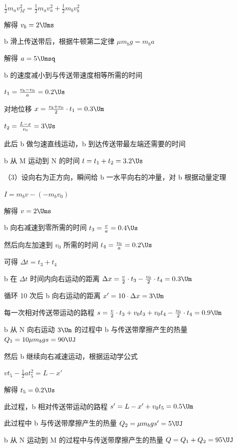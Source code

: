 \documentclass[\gkver]{gaokaozhenti}
\begin{document}
\begin{enumerate}
{$\frac{1}{2}m_{a}v_{M}^{2} = \frac{1}{2}m_{a}v_{a}^{2} + \frac{1}{2}m_{b}v_{b}^{2}$

解得 $v_{b} = 2 \Ums$

b 滑上传送带后，根据牛顿第二定律 $\mu m_{b}g = m_{b}a$

解得 $a = 5 \Umsq$

b 的速度减小到与传送带速度相等所需的时间

$t_{1} = \frac{v_{b} - v_{0}}{a} = 0.2 \Us$

对地位移 $x = \frac{v_{b} + v_{0}}{2} \cdot t_{1} = 0.3 \Um$

$t_{2} = \frac{L - x}{v_{0}} = 3 \Us$

此后 b 做匀速直线运动，b 到达传送带最左端还需要的时间

b 从 M 运动到 N 的时间 $t = t_{1} + t_{2} = 3.2 \Us$

（3）设向右为正方向，瞬间给 b 一水平向右的冲量，对 b 根据动量定理

$I = m_{b}v - (-m_{b}v_{0})$

解得 $v = 2 \Ums$

b 向右减速到零所需的时间 $t_{3} = \frac{v}{a} = 0.4 \Us$

然后向左加速到 $v_{0}$ 所需的时间 $t_{4} = \frac{v_{0}}{a} = 0.2 \Us$

可得 $\Delta t = t_{3} + t_{4}$

b 在 $\Delta t$ 时间内向右运动的距离 $\Delta x = \frac{v}{2} \cdot t_{3} - \frac{v_{0}}{2} \cdot t_{4} = 0.3 \Um$

循环 10 次后 b 向右运动的距离 $x' = 10 \cdot \Delta x = 3 \Um$

每一次相对传送带运动的路程 $s = \frac{v}{2} \cdot t_{3} + v_{0}t_{3} + v_{0}t_{4} - \frac{v_{0}}{2} \cdot t_{4} = 0.9 \Um$

b 从 N 向右运动 $3 \Um$ 的过程中 b 与传送带摩擦产生的热量 $Q_{1} = 10\mu m_{b}gs = 90 \UJ$

然后 b 继续向右减速运动，根据运动学公式

$vt_{5} - \frac{1}{2}at_{5}^{2} = L - x'$

解得 $t_{5} = 0.2 \Us$

此过程，b 相对传送带运动的路程 $s' = L - x' + v_{0}t_{5} = 0.5 \Um$

此过程中 b 与传送带摩擦产生的热量 $Q_{2} = \mu m_{b}gs' = 5 \UJ$

b 从 N 运动到 M 的过程中与传送带摩擦产生的热量 $Q = Q_{1} + Q_{2} = 95 \UJ$
}

\end{enumerate}
\end{document}
